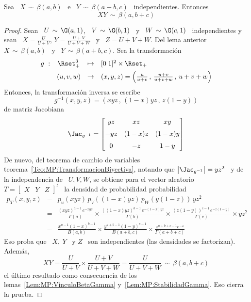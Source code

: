 \begin{lema}
\label{Lem:StabilidadBeta}
%
  Sea  \  $X \,  \sim  \, \beta(a,b)$  \  e  \ $Y  \,  \sim  \, \beta(a+b,c)$  \
  independientes. Entonces
  \[
  X Y \, \sim \, \beta(a,b+c)
  \]
\end{lema}
%
\begin{proof}
  Sean \ $U  \, \sim \, \G(a,1)$, \ $V \,  \sim \, \G(b,1)$ \ y \  $W \, \sim \,
  \G(c,1)$   \   independientes  y   sean   \   $X   =  \frac{U}{U+V}$,   $Y   =
  \frac{U+V}{U+V+W}$  \ y  \ $Z  = U+V+W$.  Del lema  anterior \  $X \,  \sim \,
  \beta(a,b)$ \ y \ $Y \, \sim \, \beta(a+b,c)$. Sea la transformaci\'on
  \[
  \begin{array}{lccl}
    g\ : & \Rset_+^3 & \mapsto & [0 \; 1]^2 \times \Rset_+\\[1.5mm]
    & (u,v,w) & \to & (x,y,z) = \left( \frac{u}{u+v} \, , \, \frac{u+v}{u+v+w} \, , \, u+v+w \right)
  \end{array}
  \]
  Entonces, la transformaci\'on inversa se escribe
  \[
  g^{-1}(x,y,z) = \left( x y z \, , \, (1-x) y z \, , \, z (1-y) \right)
  \]
  de matriz Jacobiana
  \[
  \Jac_{g^{-1}} = \begin{bmatrix}
    y z  &   x z   &   x y   \\[2mm]
  - y z  & (1-x) z & (1-x) y \\[2mm]
    0    &  - z    &  1-y
  \end{bmatrix}
  \]
  De      nuevo,      del      teorema      de     cambio      de      variables
  teorema~\ref{Teo:MP:TransformacionBiyectiva}, notando que $\left| \Jac_{g^{-1}}
  \right| = y  z^2$ \ y de la independencia  de \ $U, V, W$,  se obtiene para el
  vector aleatorio  \ $  T =  \begin{bmatrix} X &  Y &  Z \end{bmatrix}^t$  \ la
  densidad de probabilidad probabilidad
  \begin{eqnarray*}
    p_T(x,y,z) & = & p_u( x y z ) \, p_V( (1-x) y z ) \, p_W( y (1-z) ) \, y z^2\\[2mm]
    & = & \frac{\left( x y z \right)^{a-1} \, e^{- x y z}}{\Gamma(a)} \times
    \frac{\left( (1-x) y z \right)^{b-1} \, e^{- (1-x) y z}}{\Gamma(b)} \times
    \frac{\left( z (1-y) \right)^{c-1} \, e^{- z (1-y)}}{\Gamma(c)} \times y
    z^2\\[2mm]
    & = & \frac{x^{a-1} (1-x)^{b-1}}{B(a,b)} \times \frac{y^{a+b-1}
      (1-y)^{c-1}}{B(a+b,c)} \times \frac{z^{a+b+c-1} e^{-z}}{\Gamma(a+b+c)}
  \end{eqnarray*}
  Eso proba  que \  $X, \ Y$  \ y  $Z$ \ son  independientes (las  densidades se
  factorizan). Adem\'as,
  \[
  X  Y =  \frac{U}{U+V} \times  \frac{U+V}{U+V+W} =  \frac{U}{U+V+W} \,  \sim \,
  \beta(a,b+c)
  \]
  el      \'ultimo       resultado      como      consecuencia       de      los
  lemas~\ref{Lem:MP:VinculoBetaGamma}    y~\ref{Lem:MP:StabilidadGamma}.     Eso
  cierra la prueba.
\end{proof}


